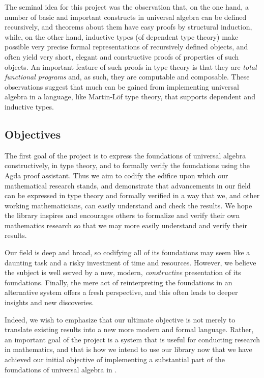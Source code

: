 The seminal idea for this project was the observation that, on the one hand, a number of basic and important constructs in universal algebra can be defined recursively, and theorems about them have easy proofs by structural induction, while, on the other hand, inductive types (of dependent type theory) make possible very precise formal representations of recursively defined objects, and often yield very short, elegant and constructive proofs of properties of such objects. An important feature of such proofs in type theory is that they are \textit{total functional programs} and, as such, they are computable and composable.  These observations suggest that much can be gained from implementing universal algebra in a language, like Martin-L\"of type theory, that supports dependent and inductive types.

\subsection{Objectives}\label{objectives}
The first goal of the project is to express the foundations of universal algebra constructively, in type theory, and to formally verify the foundations using the Agda proof assistant. Thus we aim to codify the edifice upon which our mathematical research stands, and demonstrate that advancements in our field can be expressed in type theory and formally verified in a way that we, and other working mathematicians, can easily understand and check the results. We hope the library inspires and encourages others to formalize and verify their own mathematics research so that we may more easily understand and verify their results.

Our field is deep and broad, so codifying all of its foundations may seem like a daunting task and a risky investment of time and resources. However, we believe the subject is well served by a new, modern, \emph{constructive} presentation of its foundations.  Finally, the mere act of reinterpreting the foundations in an alternative system offers a fresh perspective, and this often leads to deeper insights and new discoveries.

Indeed, we wish to emphasize that our ultimate objective is not merely to translate existing results into a new more modern and formal language. Rather, an important goal of the \ualib project is a system that is useful for conducting research in mathematics, and that is how we intend to use our library now that we have achieved our initial objective of implementing a substantial part of the foundations of universal algebra in \agda.

